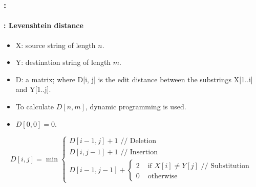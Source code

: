 \documentclass[xcolor=table]{beamer}
\begin{document}
\begin{frame}
	\frametitle{\insertshortsubtitle: \insertsection}
	\framesubtitle{\insertsubsection: Levenshtein distance}

	\begin{itemize}
		\item X: source string of length $n$.
		\item Y: destination string of length $m$.
		\item D: a matrix; where D[i, j] is the edit distance between the substrings X[1..i] and Y[1..j].
		\item To calculate $D[n, m]$, dynamic programming is used.
		\item $D[0, 0] = 0$.
	\end{itemize}
	
	\[
	D[i, j] = \min 
	\begin{cases}
	D[i - 1, j] + 1 \text{ // Deletion}\\
	D[i, j-1] + 1 \text{ // Insertion}\\
	D[i-1, j-1] + \begin{cases}
	2 & \text{ if } X[i] \ne Y[j] \text{ // Substitution}\\
	0 & \text{ otherwise}
	\end{cases}
	\end{cases}
	\]

\end{frame}
\end{document}
